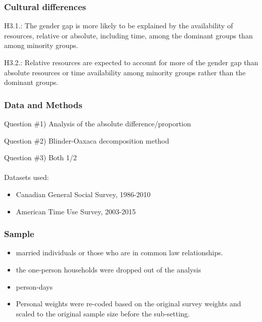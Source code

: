 \documentclass{beamer}
\begin{document}
\begin{frame}
\frametitle{Cultural differences}

\begin{tcolorbox}[colback=blue!5,colframe=blue!40!black,title=Hypothesis 3.1] 
H3.1.: The gender gap is more likely to be explained by the availability of resources, relative or absolute, including time, among the dominant groups than among minority groups.
\end{tcolorbox}

\begin{tcolorbox}[colback=blue!5,colframe=blue!40!black,title=Hypothesis 3.2] 
H3.2.: Relative resources are expected to account for more of the gender gap than absolute resources or time availability among minority groups rather than the dominant groups.
\end{tcolorbox}

\end{frame}

\begin{frame}
\frametitle{Data and Methods}

Question \#1) Analysis of the absolute difference/proportion

Question \#2) Blinder-Oaxaca decomposition method 

Question \#3) Both 1/2
\\~\\
Datasets used: 
  	\begin{itemize}
  	\item Canadian General Social Survey, 1986-2010
  	\item American Time Use Survey, 2003-2015
   	\end{itemize}
\end{frame}

\begin{frame}
\frametitle{Sample}

  	\begin{itemize}
  	\item married individuals or those who are in common law relationships. 
  	\item the one-person households were dropped out of the analysis 
  	\item person-days
  	\item Personal weights were re-coded based on the original survey weights and scaled to the original sample size before the sub-setting. 
   	\end{itemize}
\end{frame}
\end{document}
